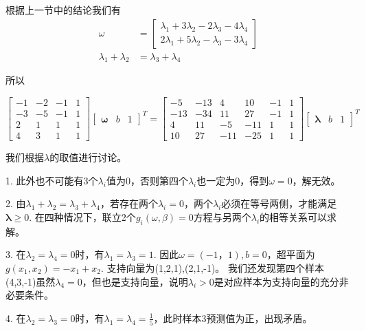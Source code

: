 \documentclass[11pt]{article}
\begin{document}
根据上一节中的结论我们有 \[
\begin{aligned}
\omega &= \left[ \begin{array}{c} \lambda_1 + 3 \lambda_2 - 2\lambda_3 - 4\lambda_4 \\ 2\lambda_1 +5\lambda_2 - \lambda_3 -3\lambda_4\end{array}\right] \\
\lambda_1 + \lambda_2 &= \lambda_3 + \lambda_4
\end{aligned}
\]

所以

\[
\left[\begin{array}{cccc}
-1 & -2 & -1 & 1 \\
-3 & -5 & -1 & 1 \\
2 & 1 & 1 & 1 \\
4 & 3 & 1 & 1 \end{array} \right] \left[\begin{array}{ccc} \boldsymbol{\omega} & b & 1 \end{array}\right]^T =
\left[\begin{array}{cccccc}
-5 & -13 & 4 & 10 & -1 & 1 \\
-13 & -34 & 11 & 27 & -1 & 1 \\
4 & 11 & -5 & -11 & 1 & 1 \\
10 & 27 & -11 & -25 & 1 & 1 \end{array} \right] \left[\begin{array}{ccc} \boldsymbol{\lambda} & b & 1 \end{array}\right]^T
\]

我们根据\(\lambda\)的取值进行讨论。 

1. 此外也不可能有3个\(\lambda_i\)值为0，否则第四个\(\lambda_i\)也一定为0，得到\(\omega = 0\)，解无效。

2. 由\(\lambda_1 + \lambda_2 = \lambda_3 + \lambda_4\)，若存在两个\(\lambda_i=0\)，两个\(\lambda_i\)必须在等号两侧，才能满足\(\boldsymbol{\lambda}\geq 0\).
在四种情况下，联立2个\(g_i(\omega,\beta)=0\)方程与另两个\(\lambda_i\)的相等关系可以求解。

3. 在\(\lambda_2 = \lambda_4 = 0\)时，有\(\lambda_1 = \lambda_3 = 1\).
因此\(\omega = (-1，1),b = 0\)，超平面为\(g(x_1,x_2) = -x_1 + x_2\).
支持向量为(1,2,1),(2,1,-1)。
我们还发现第四个样本(4,3,-1)虽然\(\lambda_4=0\)，但也是支持向量，说明\(\lambda_i>0\)是对应样本为支持向量的充分非必要条件。

4. 在\(\lambda_2 = \lambda_3 = 0\)时，有\(\lambda_1 = \lambda_4 = \frac{1}{5}\)，此时样本3预测值为正，出现矛盾。
\end{document}
